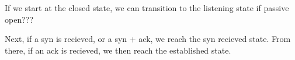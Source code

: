 \section{}
If we start at the closed state, we can transition to the listening state if
passive open???

Next, if a syn is recieved, or a syn + ack, we reach the syn recieved state.
From there, if an ack is recieved, we then reach the established state. 
